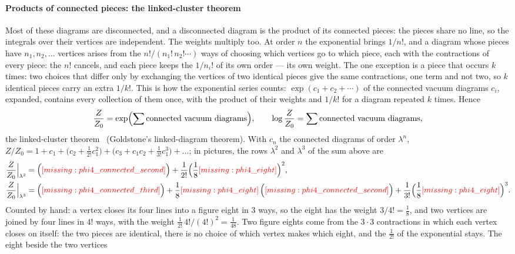 \documentclass[11pt,a4paper]{article}
\newcommand{\inputfigure}[1]{\IfFileExists{figures/#1.tex}{}{\textcolor{red}{[missing: \detokenize{#1}]}}}
\begin{document}
\paragraph{Products of connected pieces: the linked-cluster theorem} Most of these diagrams are disconnected, and a
disconnected diagram is the product of its connected pieces: the pieces share no line, so the integrals over their vertices
are independent. The weights multiply too. At order $n$ the exponential brings $1/n!$, and a diagram whose pieces have
$n_1,n_2,\dots$ vertices arises from the $n!/(n_1!\,n_2!\cdots)$ ways of choosing which vertices go to which piece, each
with the contractions of every piece: the $n!$ cancels, and each piece keeps the $1/n_i!$ of its own order --- its own
weight. The one exception is a piece that occurs $k$ times: two choices that differ only by exchanging the vertices of two
identical pieces give the same contractions, one term and not two, so $k$ identical pieces carry an extra $1/k!$. This is
how the exponential series counts: $\exp(c_1+c_2+\cdots)$ of the connected vacuum diagrams $c_i$, expanded, contains every
collection of them once, with the product of their weights and $1/k!$ for a diagram repeated $k$ times. Hence
\[
\frac{Z}{Z_0}=\exp\Bigl(\sum\text{connected vacuum diagrams}\Bigr),\qquad
\log\frac{Z}{Z_0}=\sum\text{connected vacuum diagrams},
\]
the linked-cluster theorem~\cite{Goldstone1957,Hubbard1957,AbrikosovGorkovDzyaloshinski} (Goldstone's linked-diagram
theorem). With $c_n$ the connected diagrams of order $\lambda^n$, $Z/Z_0=1+c_1+\bigl(c_2+\frac1{2!}c_1^2\bigr)+\bigl(c_3+c_1c_2+
\frac1{3!}c_1^3\bigr)+\dots$; in pictures, the rows $\lambda^2$ and $\lambda^3$ of the sum above are
\begin{align*}
\frac{Z}{Z_0}\Big|_{\lambda^2}&=\Bigl(\inputfigure{phi4_connected_second}\Bigr)+\frac1{2!}\Bigl(\frac18\inputfigure{phi4_eight}\Bigr)^2,\\
\frac{Z}{Z_0}\Big|_{\lambda^3}&=\Bigl(\inputfigure{phi4_connected_third}\Bigr)
+\frac18\inputfigure{phi4_eight}\,\Bigl(\inputfigure{phi4_connected_second}\Bigr)+\frac1{3!}\Bigl(\frac18\inputfigure{phi4_eight}\Bigr)^3.
\end{align*}
Counted by hand: a vertex closes its four lines into a figure eight in 3 ways, so the eight has the weight $3/4!=\frac18$,
and two vertices are joined by four lines in $4!$ ways, with the weight $\frac1{2!}\,4!/(4!)^2=\frac1{48}$. Two figure eights
come from the $3\cdot3$ contractions in which each vertex closes on itself: the two pieces are identical, there is no
choice of which vertex makes which eight, and the $\frac1{2!}$ of the exponential stays. The eight beside the two vertices
\end{document}
